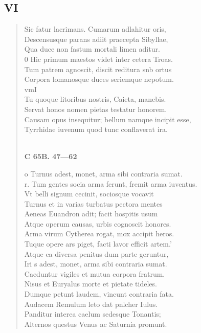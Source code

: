 \documentclass[11pt, a4paper]{report}
\begin{document}
            \subsection*{VI}
      \begin{verse}
      Sic fatur lacrimans. \rbrack  Cumarum adlahitur oris, \\ Descensusque parans adiit praecepta Sibyllae, \\ Qua duce non fastum mortali limen aditur. \\ 0 Hic primum maestos videt inter cetera Troas. \\ Tum patrem agnoscit, discit reditura snb ortus \\ Corpora lomanosque duces seriemque nepotum. \\ vmI \\ Tu quoque litoribus nostris, \rbrack  Caieta, manebis. \\ Servat honos nomen pietas testatur honorem. \\ Causam opus insequitur; bellum namque incipit esse, \\ Tyrrhidae iuvenum quod tunc conflaverat ira. \\ 
        ﻿\pagebreak 
    \begin{center} \textbf{C 65B. 47—62} \end{center} \marginpar{[124]} o Turnus adest, monet, arma sibi contraria sumat. \\ r. Tum gentes socia arma ferunt, fremit arma iuventus. \\ Vt belli signum \rbrack  cecinit, sociosque vocavit \\ Turnus et in varias turbatus pectora mentes \\ Aeneas Euandron adit; facit hospitis usum \\ Atque operum causas, urbis cognoscit honores. \\ Arma virum Cytherea rogat, mox accipit heros. \\ Tuque opere ars piget, facti lavor efficit artem.’ \\ Atque ea diversa penitus dum parte geruntur, \\ Iri \rbrack s adest, monet, arma sibi contraria sumat. \\ Caeduntur vigiles et mutua corpora fratrum. \\ Nisus et Euryalus morte et pietate tideles. \\ Dumque petunt laudem, vincunt contraria fata. \\ Audacem Remulum leto dat pnlcher Iulus. \\ Panditur interea \lbrack  caelum sedesque Tonantis; \\ Alternos questus Venus ac Saturnia promunt. \\ 

\end{verse}
\end{document}
